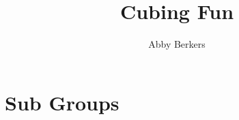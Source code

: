 \documentclass[oneside]{book}
\title{Cubing Fun}
\author{Abby Berkers}
\begin{document}
    \maketitle
    \clearpage

    \tableofcontents
    \clearpage

    

    

    \chapter{Sub Groups}
    

    
    
\end{document}

